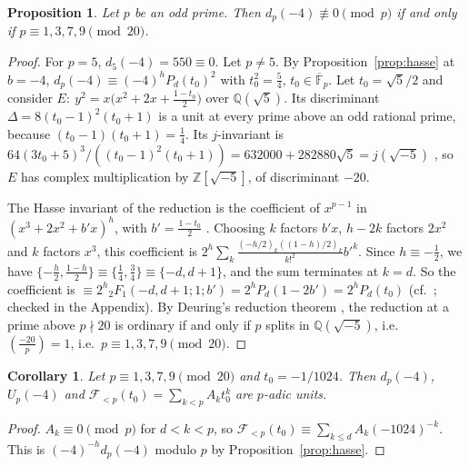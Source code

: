 \documentclass[11pt]{amsart}
\newtheorem{proposition}[theorem]{Proposition}
\newtheorem{corollary}[theorem]{Corollary}
\theoremstyle{definition}
\theoremstyle{remark}
\newcommand{\Z}{\mathbb{Z}}
\newcommand{\Q}{\mathbb{Q}}
\newcommand{\F}{\mathbb{F}}
\newcommand{\cF}{\mathcal{F}}
\begin{document}
\begin{proposition}\label{prop:CMdichotomy}
Let $p$ be an odd prime. Then $d_p(-4)\not\equiv0\pmod p$ if and only if $p\equiv1,3,7,9\pmod{20}$.
\end{proposition}
\begin{proof}
For $p=5$, $d_5(-4)=550\equiv0$. Let $p\ne5$. By Proposition~\ref{prop:hasse} at $b=-4$,
$d_p(-4)\equiv(-4)^hP_d(t_0)^2$ with $t_0^2=\frac54$, $t_0\in\overline{\F}_p$. Let $t_0=\sqrt5/2$ and
consider
$E:\ y^2=x\bigl(x^2+2x+\tfrac{1-t_0}2\bigr)$ over $\Q(\sqrt5)$. Its discriminant
$\Delta=8(t_0-1)^2(t_0+1)$ is a unit at every prime above an odd rational prime, because
$(t_0-1)(t_0+1)=\frac14$. Its $j$-invariant is
$64(3t_0+5)^3/((t_0-1)^2(t_0+1))=632000+282880\sqrt5=j(\sqrt{-5})$ \cite{Duke}, so $E$ has complex
multiplication by $\Z[\sqrt{-5}]$, of discriminant $-20$.

The Hasse invariant of the reduction is the coefficient of $x^{p-1}$ in
$(x^3+2x^2+b'x)^h$, with $b'=\frac{1-t_0}2$ \cite[Theorem V.4.1(a)]{Silverman}. Choosing $k$ factors
$b'x$, $h-2k$ factors $2x^2$ and $k$ factors $x^3$, this coefficient is
$2^h\sum_k\frac{(-h/2)_k((1-h)/2)_k}{k!^2}b'^k$. Since $h\equiv-\frac12$, we have
$\{-\frac h2,\frac{1-h}2\}\equiv\{\frac14,\frac34\}\equiv\{-d,d+1\}$, and the sum terminates at
$k=d$. So the coefficient is
$\equiv2^h{}_2F_1(-d,d+1;1;b')=2^hP_d(1-2b')=2^hP_d(t_0)$ (cf.\ \cite[\S5]{K26}; checked in the
Appendix). By Deuring's reduction theorem
\cite{Deuring,EOY}, the reduction at a prime above $p\nmid20$ is ordinary if and only if $p$ splits
in $\Q(\sqrt{-5})$, i.e.\ $\left(\frac{-20}p\right)=1$, i.e.\ $p\equiv1,3,7,9\pmod{20}$.
\end{proof}

\begin{corollary}\label{cor:units}
Let $p\equiv1,3,7,9\pmod{20}$ and $t_0=-1/1024$. Then $d_p(-4)$, $U_p(-4)$ and
$\cF_{<p}(t_0)=\sum_{k<p}A_kt_0^k$ are $p$-adic units.
\end{corollary}
\begin{proof}
$A_k\equiv0\pmod p$ for $d<k<p$, so $\cF_{<p}(t_0)\equiv\sum_{k\le d}A_k(-1024)^{-k}$. This is
$(-4)^{-h}d_p(-4)$ modulo $p$ by Proposition~\ref{prop:hasse}.
\end{proof}
\end{document}
